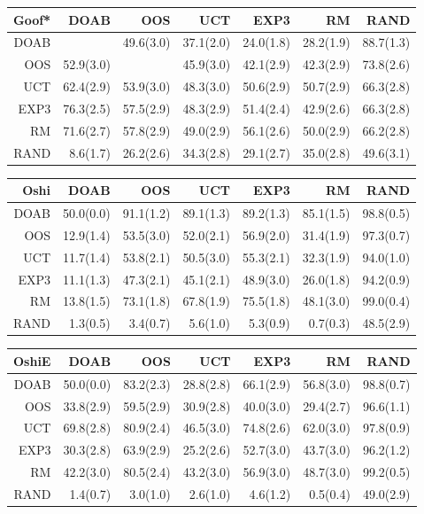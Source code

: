 \begin{figure}
\centering
\begin{footnotesize}
\begin{tabular}{|r|rrrrrr|}\hline
Goof*&DOAB&OOS&UCT&EXP3&RM&RAND\\\hline
DOAB&&49.6(3.0)&37.1(2.0)&24.0(1.8)&28.2(1.9)&88.7(1.3)\\
OOS&52.9(3.0)&&45.9(3.0)&42.1(2.9)&42.3(2.9)&73.8(2.6)\\
UCT&62.4(2.9)&53.9(3.0)&48.3(3.0)&50.6(2.9)&50.7(2.9)&66.3(2.8)\\
EXP3&76.3(2.5)&57.5(2.9)&48.3(2.9)&51.4(2.4)&42.9(2.6)&66.3(2.8)\\
RM&71.6(2.7)&57.8(2.9)&49.0(2.9)&56.1(2.6)&50.0(2.9)&66.2(2.8)\\
RAND&8.6(1.7)&26.2(2.6)&34.3(2.8)&29.1(2.7)&35.0(2.8)&49.6(3.1)\\
\hline
\end{tabular}
\begin{tabular}{|r|rrrrrr|}\hline
Oshi&DOAB&OOS&UCT&EXP3&RM&RAND\\\hline
DOAB&50.0(0.0)&91.1(1.2)&89.1(1.3)&89.2(1.3)&85.1(1.5)&98.8(0.5)\\
OOS&12.9(1.4)&53.5(3.0)&52.0(2.1)&56.9(2.0)&31.4(1.9)&97.3(0.7)\\
UCT&11.7(1.4)&53.8(2.1)&50.5(3.0)&55.3(2.1)&32.3(1.9)&94.0(1.0)\\
EXP3&11.1(1.3)&47.3(2.1)&45.1(2.1)&48.9(3.0)&26.0(1.8)&94.2(0.9)\\
RM&13.8(1.5)&73.1(1.8)&67.8(1.9)&75.5(1.8)&48.1(3.0)&99.0(0.4)\\
RAND&1.3(0.5)&3.4(0.7)&5.6(1.0)&5.3(0.9)&0.7(0.3)&48.5(2.9)\\
\hline
\end{tabular}
\begin{tabular}{|r|rrrrrr|}\hline
OshiE&DOAB&OOS&UCT&EXP3&RM&RAND\\\hline
DOAB&50.0(0.0)&83.2(2.3)&28.8(2.8)&66.1(2.9)&56.8(3.0)&98.8(0.7)\\
OOS&33.8(2.9)&59.5(2.9)&30.9(2.8)&40.0(3.0)&29.4(2.7)&96.6(1.1)\\
UCT&69.8(2.8)&80.9(2.4)&46.5(3.0)&74.8(2.6)&62.0(3.0)&97.8(0.9)\\
EXP3&30.3(2.8)&63.9(2.9)&25.2(2.6)&52.7(3.0)&43.7(3.0)&96.2(1.2)\\
RM&42.2(3.0)&80.5(2.4)&43.2(3.0)&56.9(3.0)&48.7(3.0)&99.2(0.5)\\
RAND&1.4(0.7)&3.0(1.0)&2.6(1.0)&4.6(1.2)&0.5(0.4)&49.0(2.9)\\
\hline

\end{tabular}
\end{footnotesize}
\end{figure}
